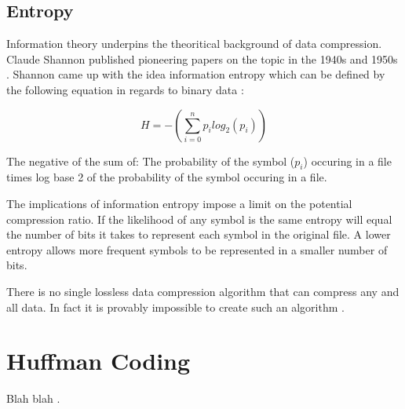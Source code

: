 \doublespacing
\singlespacing
\subsection{Entropy}


\singlespacing


Information theory underpins the theoritical background of data compression. Claude Shannon published pioneering  papers on the topic in the 1940s and 1950s \cite{WikiDataCompression}. Shannon came up with the idea information entropy which can be defined by the following equation in regards to binary data \cite{MasseyStudyGuide}:


\begin{equation*}
  H = -\left(\sum\limits_{i=0}^n p_{i} log_{2}(p_{i})\right)
\end{equation*}


\doublespacing
\singlespacing
The negative of the sum of: The probability of the symbol ($p_{i}$) occuring in a file times log base 2 of the probability of the symbol occuring in a file.


\doublespacing
\singlespacing
The implications of information entropy impose a limit on the potential compression ratio. If the likelihood of any symbol is the same entropy will equal the number of bits it takes to represent each symbol in the original file. A lower entropy allows more frequent symbols to be represented in a smaller number of bits.


\doublespacing
\singlespacing
There is no single lossless data compression algorithm that can compress any and all data. In fact it is provably impossible to create such an algorithm \cite{WikiLossless}.


\section{Huffman Coding}

Blah blah \cite{BookVLC}.



